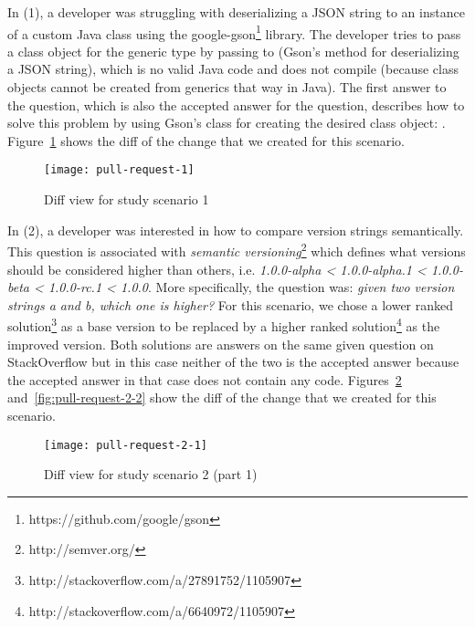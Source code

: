 \documentclass[../manifest.tex]{subfiles}
\begin{document}
In (1), a developer was struggling with deserializing a JSON string to an instance of a custom Java class using the google-gson\footnote{https://github.com/google/gson} library. The developer tries to pass a class object for the generic type  by passing  to  (Gson's method for deserializing a JSON string), which is no valid Java code and does not compile (because class objects cannot be created from generics that way in Java). The first answer to the question, which is also the accepted answer for the question, describes how to solve this problem by using Gson's  class for creating the desired class object: . Figure~\ref{fig:pull-request-1} shows the diff of the change that we created for this scenario.

\begin{figure}[h]
  \centering
  \texttt{[image: pull-request-1]}
  \caption{Diff view for study scenario 1}
  \label{fig:pull-request-1}
\end{figure}

In (2), a developer was interested in how to compare version strings semantically. This question is associated with \textit{semantic versioning}\footnote{http://semver.org/} which defines what versions should be considered higher than others, i.e. \textit{1.0.0-alpha < 1.0.0-alpha.1 < 1.0.0-beta < 1.0.0-rc.1 < 1.0.0}. More specifically, the question was: \textit{given two version strings a and b, which one is higher?} For this scenario, we chose a lower ranked solution\footnote{http://stackoverflow.com/a/27891752/1105907} as a base version to be replaced by a higher ranked solution\footnote{http://stackoverflow.com/a/6640972/1105907} as the improved version. Both solutions are answers on the same given question on StackOverflow but in this case neither of the two is the accepted answer because the accepted answer in that case does not contain any code. Figures~\ref{fig:pull-request-2-1} and~\ref{fig:pull-request-2-2} show the diff of the change that we created for this scenario.


\begin{figure}[h]
  \label{fig:pull-request-2-1}
  \centering
  \texttt{[image: pull-request-2-1]}
  \caption{Diff view for study scenario 2 (part 1)}
\end{figure}
\end{document}
